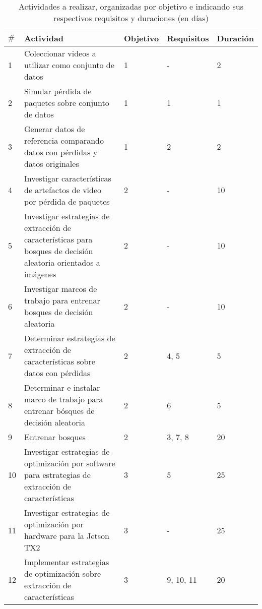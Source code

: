 \begin{table} [!h]
    \caption{Actividades a realizar, organizadas por objetivo e indicando sus respectivos requisitos y duraciones (en días)}
    \label{tab:actividades}
    \centering
    \begin{tabular}{p{0.4 cm} p{7.8 cm} p{1.6 cm} p{2 cm} p{2 cm}}
        \hline
        $\#$ & Actividad & Objetivo & Requisitos & Duración \\
        \hline
        1 & Coleccionar videos a utilizar como conjunto de datos & 1 & - & 2 \\
        2 & Simular pérdida de paquetes sobre conjunto de datos & 1 & 1 & 1 \\
        3 & Generar datos de referencia comparando datos con pérdidas y datos originales & 1 & 2 & 2 \\
        \hline
        4 & Investigar características de artefactos de video por pérdida de paquetes & 2 & - & 10 \\
        5 & Investigar estrategias de extracción de características para bosques de decisión aleatoria orientados a imágenes & 2 & - & 10 \\
        6 & Investigar marcos de trabajo para entrenar bosques de decisión aleatoria & 2 & - & 10 \\
        7 & Determinar estrategias de extracción de características sobre datos con pérdidas & 2 & 4, 5 & 5 \\
        8 & Determinar e instalar marco de trabajo para entrenar bósques de decisión aleatoria & 2 & 6 & 5 \\
        9 & Entrenar bosques & 2 & 3, 7, 8 & 20 \\
        \hline
        10 & Investigar estrategias de optimización por software para estrategias de extracción de características & 3 & 5 & 25 \\
        11 & Investigar estrategias de optimización por hardware para la Jetson TX2 & 3 & - & 25 \\
        12 & Implementar estrategias de optimización sobre extracción de características & 3 & 9, 10, 11 & 20 \\
        \hline
    \end{tabular}
\end{table}
